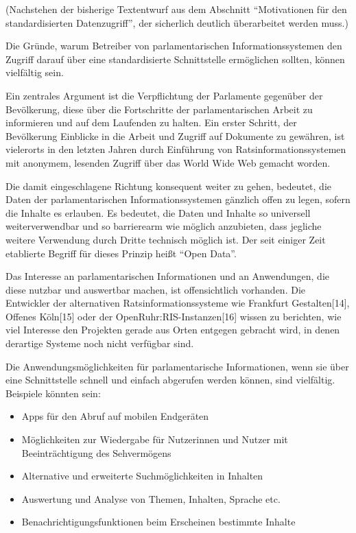 \documentclass[,a4paper]{article}
\begin{document}
(Nachstehen der bisherige Textentwurf aus dem Abschnitt ``Motivationen
für den standardisierten Datenzugriff'', der sicherlich deutlich
überarbeitet werden muss.)

Die Gründe, warum Betreiber von parlamentarischen Informationssystemen
den Zugriff darauf über eine standardisierte Schnittstelle ermöglichen
sollten, können vielfältig sein.

Ein zentrales Argument ist die Verpflichtung der Parlamente gegenüber
der Bevölkerung, diese über die Fortschritte der parlamentarischen
Arbeit zu informieren und auf dem Laufenden zu halten. Ein erster
Schritt, der Bevölkerung Einblicke in die Arbeit und Zugriff auf
Dokumente zu gewähren, ist vielerorts in den letzten Jahren durch
Einführung von Ratsinformationssystemen mit anonymem, lesenden Zugriff
über das World Wide Web gemacht worden.

Die damit eingeschlagene Richtung konsequent weiter zu gehen, bedeutet,
die Daten der parlamentarischen Informationssystemen gänzlich offen zu
legen, sofern die Inhalte es erlauben. Es bedeutet, die Daten und
Inhalte so universell weiterverwendbar und so barrierearm wie möglich
anzubieten, dass jegliche weitere Verwendung durch Dritte technisch
möglich ist. Der seit einiger Zeit etablierte Begriff für dieses Prinzip
heißt ``Open Data''.

Das Interesse an parlamentarischen Informationen und an Anwendungen, die
diese nutzbar und auswertbar machen, ist offensichtlich vorhanden. Die
Entwickler der alternativen Ratsinformationssysteme wie Frankfurt
Gestalten{[}14{]}, Offenes Köln{[}15{]} oder der
OpenRuhr:RIS-Instanzen{[}16{]} wissen zu berichten, wie viel Interesse
den Projekten gerade aus Orten entgegen gebracht wird, in denen
derartige Systeme noch nicht verfügbar sind.

Die Anwendungsmöglichkeiten für parlamentarische Informationen, wenn sie
über eine Schnittstelle schnell und einfach abgerufen werden können,
sind vielfältig. Beispiele könnten sein:

\begin{itemize}
\item
  Apps für den Abruf auf mobilen Endgeräten
\item
  Möglichkeiten zur Wiedergabe für Nutzerinnen und Nutzer mit
  Beeinträchtigung des Sehvermögens
\item
  Alternative und erweiterte Suchmöglichkeiten in Inhalten
\item
  Auswertung und Analyse von Themen, Inhalten, Sprache etc.
\item
  Benachrichtigungsfunktionen beim Erscheinen bestimmte Inhalte
\end{itemize}
\end{document}

